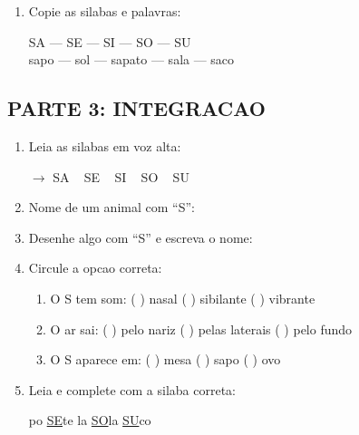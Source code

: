 \begin{exercicio}
\begin{enumerate}[resume]
  \item Copie as silabas e palavras:
  \begin{center}
  SA --- SE --- SI --- SO --- SU\\
  sapo --- sol --- sapato --- sala --- saco
  \end{center}
\end{enumerate}

\subsection*{PARTE 3: INTEGRACAO}

\begin{enumerate}[resume]
  \item Leia as silabas em voz alta:
  \begin{center}
  $\rightarrow$ SA  ~  SE  ~  SI  ~  SO  ~  SU
  \end{center}

  \item Nome de um animal com ``S'':
  \begin{center}
  \underline{\hspace{6cm}}
  \end{center}

  \item Desenhe algo com ``S'' e escreva o nome:
  \begin{center}
  \end{center}

  \item Circule a opcao correta:
  \begin{enumerate}[label=(\alph*)]
    \item O S tem som: ( ) nasal ( ) sibilante ( ) vibrante
    \item O ar sai: ( ) pelo nariz ( ) pelas laterais ( ) pelo fundo
    \item O S aparece em: ( ) mesa ( ) sapo ( ) ovo
  \end{enumerate}

  \item Leia e complete com a silaba correta:
  \begin{center}
  po \quad \underline{SE}te \quad {}la \quad \underline{SO}la \quad \underline{SU}co
  \end{center}
\end{enumerate}
\end{exercicio}

